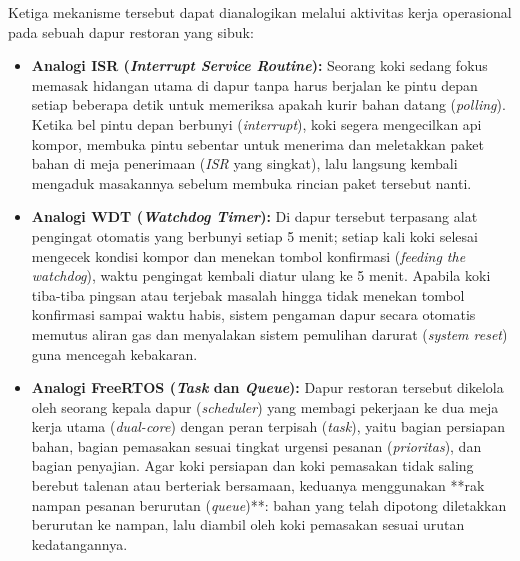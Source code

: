 \begin{enumerate}[label=\textbf{\arabic*.}, leftmargin=*, itemsep=10pt]
    Ketiga mekanisme tersebut dapat dianalogikan melalui aktivitas kerja operasional pada sebuah dapur restoran yang sibuk:
    \begin{itemize}
        \item \textbf{Analogi ISR (\textit{Interrupt Service Routine}):} Seorang koki sedang fokus memasak hidangan utama di dapur tanpa harus berjalan ke pintu depan setiap beberapa detik untuk memeriksa apakah kurir bahan datang (\textit{polling}). Ketika bel pintu depan berbunyi (\textit{interrupt}), koki segera mengecilkan api kompor, membuka pintu sebentar untuk menerima dan meletakkan paket bahan di meja penerimaan (\textit{ISR} yang singkat), lalu langsung kembali mengaduk masakannya sebelum membuka rincian paket tersebut nanti.
        \item \textbf{Analogi WDT (\textit{Watchdog Timer}):} Di dapur tersebut terpasang alat pengingat otomatis yang berbunyi setiap 5 menit; setiap kali koki selesai mengecek kondisi kompor dan menekan tombol konfirmasi (\textit{feeding the watchdog}), waktu pengingat kembali diatur ulang ke 5 menit. Apabila koki tiba-tiba pingsan atau terjebak masalah hingga tidak menekan tombol konfirmasi sampai waktu habis, sistem pengaman dapur secara otomatis memutus aliran gas dan menyalakan sistem pemulihan darurat (\textit{system reset}) guna mencegah kebakaran.
        \item \textbf{Analogi FreeRTOS (\textit{Task} dan \textit{Queue}):} Dapur restoran tersebut dikelola oleh seorang kepala dapur (\textit{scheduler}) yang membagi pekerjaan ke dua meja kerja utama (\textit{dual-core}) dengan peran terpisah (\textit{task}), yaitu bagian persiapan bahan, bagian pemasakan sesuai tingkat urgensi pesanan (\textit{prioritas}), dan bagian penyajian. Agar koki persiapan dan koki pemasakan tidak saling berebut talenan atau berteriak bersamaan, keduanya menggunakan **rak nampan pesanan berurutan (\textit{queue})**: bahan yang telah dipotong diletakkan berurutan ke nampan, lalu diambil oleh koki pemasakan sesuai urutan kedatangannya.
    \end{itemize}

\end{enumerate}